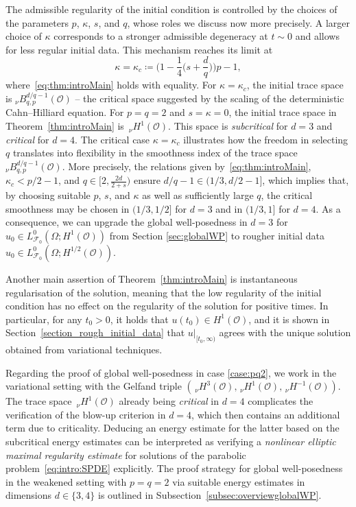 \documentclass[reqno]{amsart}
\newcommand{\F}{\mathscr{F}}
\newcommand{\sO}{\mathscr{O}}
\newcommand{\ce}{\coloneqq}
\newcommand{\1}{\mathbf{1}}
\newcommand{\nH}{\ensuremath{\,_\nu H}}
\newcommand{\bpsn}[1]{\ensuremath{\nH^{#1}(\sO)}}
\begin{document}
The admissible regularity of the initial condition is controlled by the choices of the parameters $p$, $\kappa$, $s$, and $q$, whose roles we discuss now more precisely. A larger choice of $\kappa$ corresponds to a stronger admissible degeneracy at $t\sim 0$ and allows for less regular initial data. This mechanism reaches its limit at
\begin{equation*}
\kappa=\kappa_c\ce \Big(
1-\frac{1}{4}\Big(s+\frac{d}{q}\Big)\Big)p-1,
\end{equation*}
where~\eqref{eq:thm:introMain} holds with equality. For $\kappa=\kappa_c$, the initial trace space is $_\nu B_{q,p}^{d/q-1}(\sO)$ -- the critical space suggested by the scaling of the deterministic Cahn--Hilliard equation. For $p=q=2$ and $s=\kappa=0$, the initial trace space in Theorem~\ref{thm:introMain} is $\bpsn{1}$. This space is \emph{subcritical} for $d=3$ and \emph{critical} for $d=4$.
The critical case $\kappa=\kappa_c$ illustrates how the freedom in selecting $q$ translates into flexibility in the smoothness index of the trace space $_\nu B_{q,p}^{d/q-1}(\sO)$. More precisely, the relations given by~\eqref{eq:thm:introMain}, $\kappa_c<p/2-1$, and $q\in [2,\frac{2d}{2+s})$ ensure $d/q-1 \in (1/3,d/2-1]$, which implies that, by choosing  suitable $p$, $s$, and $\kappa$ as well as sufficiently large $q$, the critical smoothness may be chosen  in $(1/3,1/2]$ for $d=3$ and in $(1/3,1]$ for $d=4$. As a consequence, we can upgrade the global well-posedness in $d=3$ for $u_0\in L_{\F_0}^0(\Omega;H^1(\sO))$ from Section \ref{sec:globalWP} to rougher initial data $u_0\in L_{\F_0}^0(\Omega;H^{1/2}(\sO))$.

Another main assertion of Theorem~\ref{thm:introMain} is instantaneous regularisation of the solution, meaning that the low regularity of the initial condition has no effect on the regularity of the solution for positive times. In particular, for any $t_0>0$, it holds that $u(t_0)\in H^1(\sO)$, and it is shown in Section~\ref{section_rough_initial_data} that $u|_{[t_0,\infty)}$ agrees with the unique solution obtained from variational techniques.

Regarding the proof of global well-posedness in case \ref{case:pq2}, we work in the variational setting with the Gelfand triple $(\bpsn{3},\bpsn{1},\bpsn{-1})$. The trace space $\bpsn{1}$ already being \emph{critical} in $d=4$ complicates the verification of the blow-up criterion in $d=4$, which then contains an additional term due to criticality. Deducing an energy estimate for the latter based on the subcritical energy estimates can be interpreted as verifying a \emph{nonlinear elliptic maximal regularity estimate} for solutions of the parabolic problem~\eqref{eq:intro:SPDE} explicitly. The proof strategy for global well-posedness in the weakened setting with $p=q=2$ via suitable energy estimates in dimensions $d\in \{3,4\}$ is outlined in Subsection~\ref{subsec:overviewglobalWP}.
\end{document}
